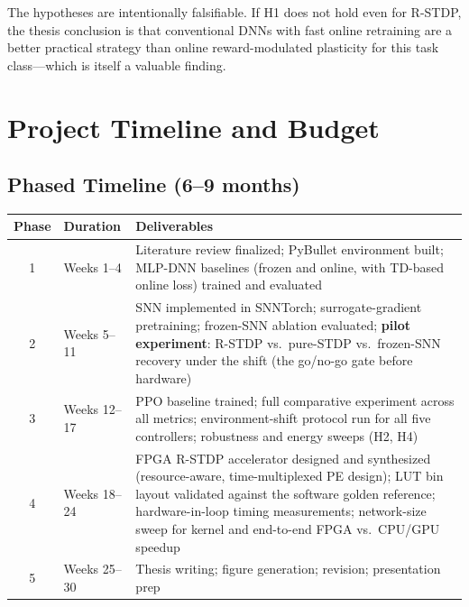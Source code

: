 \documentclass[11pt,a4paper]{article}
\begin{document}
The hypotheses are intentionally falsifiable. If H1 does not hold even for R-STDP, the
thesis conclusion is that conventional DNNs with fast online retraining are a better
practical strategy than online reward-modulated plasticity for this task class---which
is itself a valuable finding.

\section{Project Timeline and Budget}
\label{sec:timeline}

\subsection{Phased Timeline (6--9 months)}

\begin{center}
\renewcommand{\arraystretch}{1.3}
\begin{tabular}{@{}clp{8.5cm}@{}}
  \toprule
  \textbf{Phase} & \textbf{Duration} & \textbf{Deliverables} \\
  \midrule
  1 & Weeks 1--4  & Literature review finalized; PyBullet environment built; MLP-DNN
                    baselines (frozen and online, with TD-based online loss) trained
                    and evaluated \\
  2 & Weeks 5--11 & SNN implemented in SNNTorch; surrogate-gradient pretraining;
                    frozen-SNN ablation evaluated; \textbf{pilot experiment}: R-STDP
                    vs.\ pure-STDP vs.\ frozen-SNN recovery under the shift (the
                    go/no-go gate before hardware) \\
  3 & Weeks 12--17 & PPO baseline trained; full comparative experiment across all
                     metrics; environment-shift protocol run for all five
                     controllers; robustness and energy sweeps (H2, H4) \\
  4 & Weeks 18--24 & FPGA R-STDP accelerator designed and synthesized (resource-aware,
                     time-multiplexed PE design); LUT bin layout validated against the
                     software golden reference; hardware-in-loop timing measurements;
                     network-size sweep for kernel and end-to-end FPGA vs.\ CPU/GPU
                     speedup \\
  5 & Weeks 25--30 & Thesis writing; figure generation; revision; presentation prep \\
  \bottomrule
\end{tabular}
\end{center}
\end{document}
